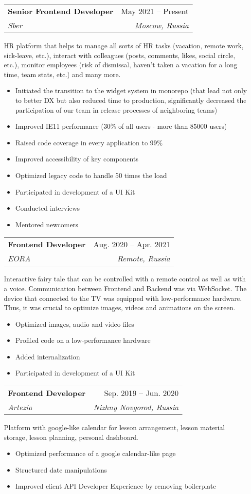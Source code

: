 \documentclass[letterpaper,11pt]{article}
\makeatletter
\newcommand{\resumeItem}[1]{
  \item\small{
    \begin{minipage}[t]{0.99\linewidth} %
      {#1}
    \end{minipage}
    \vspace{-2pt} %
  }
}
\newcommand{\resumeSubheading}[4]{
  \vspace{-2pt}\item
    \begin{tabular*}{0.97\textwidth}[t]{l@{\extracolsep{\fill}}r}
      \textbf{#1} & #2 \\
      \textit{\small#3} & \textit{\small #4} \\
    \end{tabular*}\vspace{-7pt}
}
\newcommand{\projectDescription}[1]{
    \vspace{8pt} %
    \small {#1}
    \vspace{-6pt} %
}
\newcommand{\resumeItemListStart}{\begin{itemize}}
\newcommand{\resumeItemListEnd}{\end{itemize}\vspace{-5pt}}
\makeatother
\begin{document}
    \resumeSubheading
      {Senior Frontend Developer}{May 2021 -- Present}
      {Sber}{Moscow, Russia}

    \projectDescription
      {HR platform that helps to manage all sorts of HR tasks (vacation, remote work, sick-leave, etc.), interact with colleagues (posts, comments, likes, social circle, etc.), monitor employees (risk of dismissal, haven't taken a vacation for a long time, team stats, etc.) and many more.}
        
      \resumeItemListStart
        \resumeItem{Initiated the transition to the widget system in monorepo (that lead not only to better DX but also reduced time to production, significantly decreased the participation of our team in release processes of neighboring teams)}
        \resumeItem{Improved IE11 performance (30\% of all users - more than 85000 users)}
        \resumeItem{Raised code coverage in every application to 99\%}
        \resumeItem{Improved accessibility of key components}
        \resumeItem{Optimized legacy code to handle 50 times the load}
        \resumeItem{Participated in development of a UI Kit}
        \resumeItem{Conducted interviews}
        \resumeItem{Mentored newcomers}
      \resumeItemListEnd

    \resumeSubheading
      {Frontend Developer}{Aug. 2020 -- Apr. 2021}
      {EORA}{Remote, Russia}

    \projectDescription
      {Interactive fairy tale that can be controlled with a remote control as well as with a voice. Communication between Frontend and Backend was via WebSocket. The device that connected to the TV was equipped with low-performance hardware. Thus, it was crucial to optimize images, videos and animations on the screen.}

      \resumeItemListStart
        \resumeItem{Optimized images, audio and video files}
        \resumeItem{Profiled code on a low-performance hardware}
        \resumeItem{Added internalization}
        \resumeItem{Participated in development of a UI Kit}
      \resumeItemListEnd

    \resumeSubheading
    {Frontend Developer}{Sep. 2019 -- Jun. 2020}
    {Artezio}{Nizhny Novgorod, Russia}
    
    \projectDescription
      {Platform with google-like calendar for lesson arrangement, lesson material storage, lesson planning, personal dashboard.}

    \resumeItemListStart
      \resumeItem{Optimized performance of a google calendar-like page}
      \resumeItem{Structured date manipulations}
      \resumeItem{Improved client API Developer Experience by removing boilerplate}
    \resumeItemListEnd
\end{document}
